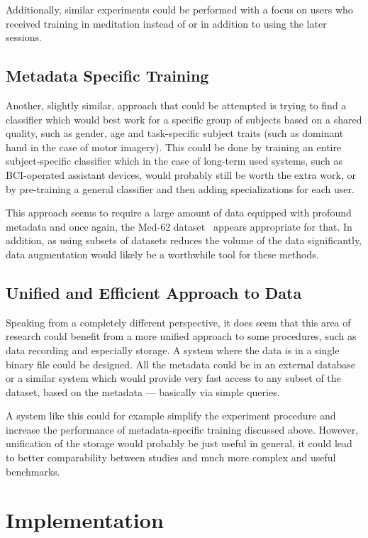 \documentclass[english, he, bc, kiv, iso690alph, viewonly]{fasthesis}
\begin{document}
Additionally, similar experiments could be performed with a focus on users who received training in meditation instead of or in addition to using the later sessions.

\section{Metadata Specific Training}
\label{sec:metadata:specific}

Another, slightly similar, approach that could be attempted is trying to find a classifier which would best work for a specific group of subjects based on a shared quality, such as gender, age and task-specific subject traits (such as dominant hand in the case of motor imagery). This could be done by training an entire subject-specific classifier which in the case of long-term used systems, such as BCI-operated assistant devices, would probably still be worth the extra work, or by pre-training a general classifier and then adding specializations for each user.

This approach seems to require a large amount of data equipped with profound metadata and once again, the Med-62 dataset~\cite{data:stieger:21} appears appropriate for that. In addition, as using subsets of datasets reduces the volume of the data significantly, data augmentation would likely be a worthwhile tool for these methods.

\section{Unified and Efficient Approach to Data}

Speaking from a completely different perspective, it does seem that this area of research could benefit from a more unified approach to some procedures, such as data recording and especially storage. A system where the data is in a single binary file could be designed. All the metadata could be in an external database or a similar system which would provide very fast access to any subset of the dataset, based on the metadata --- basically via simple queries.

A system like this could for example simplify the experiment procedure and increase the performance of metadata-specific training discussed above. However, unification of the storage would probably be just useful in general, it could lead to better comparability between studies and much more complex and useful benchmarks.

\chapter{Implementation}
\end{document}
